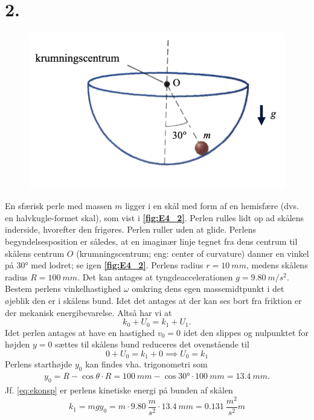\documentclass[12pt]{article}
\theoremstyle{definition}
\begin{document}
\section*{2.}
\begin{figure} [ht]
  \centering
  \caption{}
  \includegraphics[width=0.5\linewidth]{../figures/E4_2.png}
  \label{fig:E4_2}
\end{figure}

En sfærisk perle med massen $m$ ligger i en skål med form af en hemisfære (dvs. en halvkugle-formet skal), som vist i \textbf{\autoref{fig:E4_2}}. Perlen rulles lidt op ad skålens inderside, hvorefter den frigøres. Perlen ruller uden at glide. Perlens begyndelsesposition er således, at en imaginær linje tegnet fra dens centrum til skålens centrum $O$ (krumningscentrum; eng: center of curvature) danner en vinkel på \ang{30}  med lodret; se igen \textbf{\autoref{fig:E4_2}}. Perlens radius $r= \qty{10}{mm} $, medens skålens radius $R = \qty{100}{mm}$. Det kan antages at tyngdeaccelerationen $g = \qty{9,80}{m\per s^2} $. Bestem perlens vinkelhastighed $\omega$ omkring dens egen massemidtpunkt i det øjeblik den er i skålens bund.
\bigbreak
Idet det antages at der kan ses bort fra friktion er der mekanisk energibevarelse. Altså har vi at
\[
k_{0} + U_{0} = k_{1} + U_{1}
.\]
Idet perlen antages at have en hastighed $v_0 = 0$ idet den slippes og nulpunktet for højden $y = 0$ sættes til skålens bund reduceres det ovenstående til
\begin{equation} \label{eq:ekonsp}
  0 + U_{0} = k_{1} + 0 \implies U_0 = k_1
\end{equation}
Perlens starthøjde $y_0$ kan findes vha. trigonometri som
\begin{align*}
  y_0 = R - \cos \theta \cdot R = \qty{100}{mm} - \cos \ang{30} \cdot \qty{100}{mm} =  \qty{13,4}{mm} 
.\end{align*}
Jf. \autoref{eq:ekonsp} er perlens kinetiske energi på bunden af skålen
\begin{equation} \label{eq:kinp}
  k_1 = mgy_0 = m \cdot \qty{9,80}{\frac{m}{s^2}} \cdot \qty{13,4}{mm} = \qty{0,131}{\frac{m^2}{s^2}} m
\end{equation}
\end{document}
